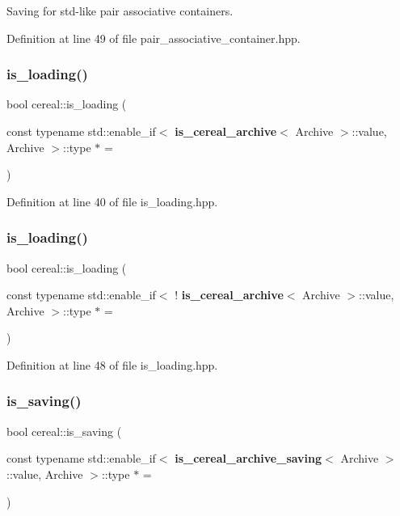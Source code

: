 Saving for std-\/like pair associative containers. 



Definition at line 49 of file pair\+\_\+associative\+\_\+container.\+hpp.

\mbox{\label{namespacecereal_ad79f9b690399d7e8aad9e7fc9ef3b797}} 
\subsubsection{is\+\_\+loading()\hspace{0.1cm}{\footnotesize\ttfamily [1/2]}}
{\footnotesize\ttfamily bool cereal\+::is\+\_\+loading (\begin{DoxyParamCaption}\item[{const typename std\+::enable\+\_\+if$<$ \textbf{ is\+\_\+cereal\+\_\+archive}$<$ Archive $>$\+::value, Archive $>$\+::type $\ast$}]{ = {} }\end{DoxyParamCaption})}



Definition at line 40 of file is\+\_\+loading.\+hpp.

\mbox{\label{namespacecereal_a91c764df4d08dfd1fa59c945143b6cd7}} 
\subsubsection{is\+\_\+loading()\hspace{0.1cm}{\footnotesize\ttfamily [2/2]}}
{\footnotesize\ttfamily bool cereal\+::is\+\_\+loading (\begin{DoxyParamCaption}\item[{const typename std\+::enable\+\_\+if$<$ !\textbf{ is\+\_\+cereal\+\_\+archive}$<$ Archive $>$\+::value, Archive $>$\+::type $\ast$}]{ = {} }\end{DoxyParamCaption})}



Definition at line 48 of file is\+\_\+loading.\+hpp.

\mbox{\label{namespacecereal_a02f9ef803550085b28fc61c79abc0147}} 
\subsubsection{is\+\_\+saving()\hspace{0.1cm}{\footnotesize\ttfamily [1/2]}}
{\footnotesize\ttfamily bool cereal\+::is\+\_\+saving (\begin{DoxyParamCaption}\item[{const typename std\+::enable\+\_\+if$<$ \textbf{ is\+\_\+cereal\+\_\+archive\+\_\+saving}$<$ Archive $>$\+::value, Archive $>$\+::type $\ast$}]{ = {} }\end{DoxyParamCaption})}



